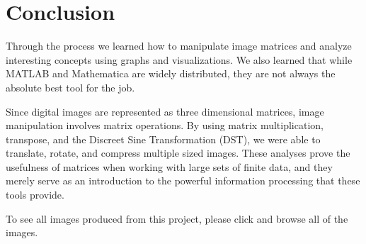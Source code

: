 \section{Conclusion}
Through the process we learned how to manipulate image matrices and analyze interesting concepts using graphs and visualizations. We also learned that while MATLAB and Mathematica are widely distributed, they are not always the absolute best tool for the job.

Since digital images are represented as three dimensional matrices, image manipulation involves matrix operations. By using matrix multiplication, transpose, and the Discreet Sine Transformation (DST), we were able to translate, rotate, and compress multiple sized images. These analyses prove the usefulness of matrices when working with large sets of finite data, and they merely serve as an introduction to the powerful information processing that these tools provide.

To see all images produced from this project, please click  and browse all of the images.
